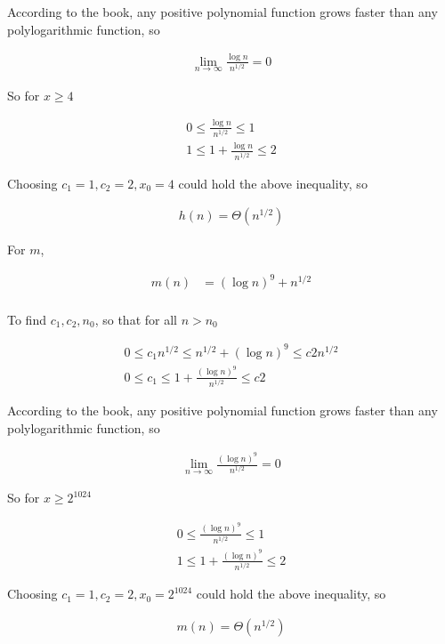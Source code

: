 \documentclass{article}
\begin{document}
According to the book, any positive polynomial function grows faster than any polylogarithmic function, so

$$\begin{aligned}
\lim\limits_{n\rightarrow\infty}\frac{\log n}{n^{1/2}}=0
\end{aligned}$$

So for $x \ge 4$

$$\begin{aligned}
0 \le \frac{\log n}{n^{1/2}} \le 1\\
1 \le 1+\frac{\log n}{n^{1/2}} \le 2
\end{aligned}$$

Choosing $c_1=1, c_2=2, x_0=4$ could hold the above inequality, so

$$\begin{aligned}
h(n)=\Theta(n^{1/2})
\end{aligned}$$

For $m$,

$$\begin{aligned}
m(n)&=(\log n)^9+n^{1/2}\\
\end{aligned}$$

To find $c_1, c_2, n_0$, so that for all $n>n_0$

$$\begin{aligned}
0 \le c_1n^{1/2} \le n^{1/2}+(\log n)^9 \le c2n^{1/2}\\
0 \le c_1 \le 1+\frac{(\log n)^9}{n^{1/2}} \le c2
\end{aligned}$$


According to the book, any positive polynomial function grows faster than any polylogarithmic function, so

$$\begin{aligned}
\lim\limits_{n\rightarrow\infty}\frac{(\log n)^9}{n^{1/2}}=0
\end{aligned}$$

So for $x \ge 2^{1024}$

$$\begin{aligned}
0 \le \frac{(\log n)^9}{n^{1/2}} \le 1\\
1 \le 1+\frac{(\log n)^9}{n^{1/2}} \le 2
\end{aligned}$$

Choosing $c_1=1, c_2=2, x_0=2^{1024}$ could hold the above inequality, so

$$\begin{aligned}
m(n)=\Theta(n^{1/2})
\end{aligned}$$
\end{document}
